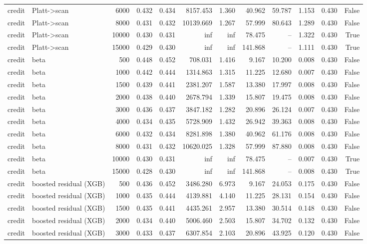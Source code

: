 \begin{tabular}{llrrrrrrrrrr}
credit & Platt->scan & 6000 & 0.432 & 0.434 & 8157.453 & 1.360 & 40.962 & 59.787 & 1.153 & 0.430 & False \\
credit & Platt->scan & 8000 & 0.431 & 0.432 & 10139.669 & 1.267 & 57.999 & 80.643 & 1.289 & 0.430 & False \\
credit & Platt->scan & 10000 & 0.430 & 0.431 & inf & inf & 78.475 & -- & 1.322 & 0.430 & True \\
credit & Platt->scan & 15000 & 0.429 & 0.430 & inf & inf & 141.868 & -- & 1.111 & 0.430 & True \\
credit & beta & 500 & 0.448 & 0.452 & 708.031 & 1.416 & 9.167 & 10.200 & 0.008 & 0.430 & False \\
credit & beta & 1000 & 0.442 & 0.444 & 1314.863 & 1.315 & 11.225 & 12.680 & 0.007 & 0.430 & False \\
credit & beta & 1500 & 0.439 & 0.441 & 2381.207 & 1.587 & 13.380 & 17.997 & 0.008 & 0.430 & False \\
credit & beta & 2000 & 0.438 & 0.440 & 2678.794 & 1.339 & 15.807 & 19.475 & 0.008 & 0.430 & False \\
credit & beta & 3000 & 0.436 & 0.437 & 3847.182 & 1.282 & 20.896 & 26.124 & 0.007 & 0.430 & False \\
credit & beta & 4000 & 0.434 & 0.435 & 5728.909 & 1.432 & 26.942 & 39.363 & 0.008 & 0.430 & False \\
credit & beta & 6000 & 0.432 & 0.434 & 8281.898 & 1.380 & 40.962 & 61.176 & 0.008 & 0.430 & False \\
credit & beta & 8000 & 0.431 & 0.432 & 10620.025 & 1.328 & 57.999 & 87.880 & 0.008 & 0.430 & False \\
credit & beta & 10000 & 0.430 & 0.431 & inf & inf & 78.475 & -- & 0.007 & 0.430 & True \\
credit & beta & 15000 & 0.428 & 0.430 & inf & inf & 141.868 & -- & 0.008 & 0.430 & True \\
credit & boosted residual (XGB) & 500 & 0.436 & 0.452 & 3486.280 & 6.973 & 9.167 & 24.053 & 0.175 & 0.430 & False \\
credit & boosted residual (XGB) & 1000 & 0.435 & 0.444 & 4139.881 & 4.140 & 11.225 & 28.131 & 0.154 & 0.430 & False \\
credit & boosted residual (XGB) & 1500 & 0.435 & 0.441 & 4435.261 & 2.957 & 13.380 & 30.514 & 0.148 & 0.430 & False \\
credit & boosted residual (XGB) & 2000 & 0.434 & 0.440 & 5006.460 & 2.503 & 15.807 & 34.702 & 0.132 & 0.430 & False \\
credit & boosted residual (XGB) & 3000 & 0.433 & 0.437 & 6307.854 & 2.103 & 20.896 & 43.925 & 0.120 & 0.430 & False \\

\end{tabular}
